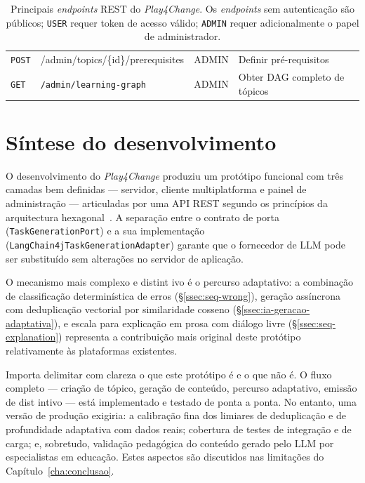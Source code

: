 \begin{table}[htbp]
\begin{tabular}{p{1.5cm} p{6.0cm} p{1.3cm} p{3.8cm}}
		\texttt{POST}  & {\ttfamily /admin/\allowbreak topics/\allowbreak\{id\}/\allowbreak prerequisites} & ADMIN & Definir pr\'e-requisitos \\
		\texttt{GET}   & \texttt{/admin/learning-graph}                   & ADMIN & Obter DAG completo de t\'opicos \\
		\bottomrule
	\end{tabular}
	\caption[Principais \emph{endpoints} REST do \emph{Play4Change}]{Principais \emph{endpoints} REST do \emph{Play4Change}. Os \emph{endpoints} sem autentica\c{c}\~ao s\~ao p\'ublicos; \texttt{USER} requer token de acesso v\'alido; \texttt{ADMIN} requer adicionalmente o papel de administrador.}
	\label{tab:api-endpoints}
\end{table}

\section{S\'intese do desenvolvimento}
\label{sec:sintese-desenvolvimento}

\begin{sloppypar}
O desenvolvimento do \emph{Play4Change} produziu um prot\'otipo funcional com
tr\^es camadas bem definidas --- servidor, cliente multiplatforma e painel de
administra\c{c}\~ao --- articuladas por uma API REST segundo os princ\'ipios da
arquitectura hexagonal~\cite{cockburn2005hexagonal}. A separa\c{c}\~ao entre o
contrato de porta (\texttt{TaskGenerationPort}) e a sua implementa\c{c}\~ao
(\texttt{LangChain4jTaskGenerationAdapter}) garante que o fornecedor de LLM
pode ser substitu\'ido sem altera\c{c}\~oes no servidor de aplica\c{c}\~ao.
\end{sloppypar}

O mecanismo mais complexo e distint ivo \'e o percurso adaptativo: a
combina\c{c}\~ao de classifica\c{c}\~ao determin\'istica de erros
(\S\ref{ssec:seq-wrong}), gera\c{c}\~ao ass\'incrona com deduplica\c{c}\~ao
vectorial por similaridade cosseno (\S\ref{ssec:ia-geracao-adaptativa}), e
escala para explica\c{c}\~ao em prosa com di\'alogo livre
(\S\ref{ssec:seq-explanation}) representa a contribui\c{c}\~ao mais original
deste prot\'otipo relativamente \`as plataformas existentes.

Importa delimitar com clareza o que este prot\'otipo \'e e o que n\~ao \'e.
O fluxo completo --- cria\c{c}\~ao de t\'opico, gera\c{c}\~ao de conte\'udo,
percurso adaptativo, emiss\~ao de dist intivo --- est\'a implementado e
testado de ponta a ponta. No entanto, uma vers\~ao de produ\c{c}\~ao exigiria:
a calibra\c{c}\~ao fina dos limiares de deduplica\c{c}\~ao e de profundidade
adaptativa com dados reais; cobertura de testes de integra\c{c}\~ao e de carga;
e, sobretudo, valida\c{c}\~ao pedag\'ogica do conte\'udo gerado pelo LLM por
especialistas em educa\c{c}\~ao. Estes aspectos s\~ao discutidos nas limita\c{c}\~oes
do Cap\'itulo~\ref{cha:conclusao}.
